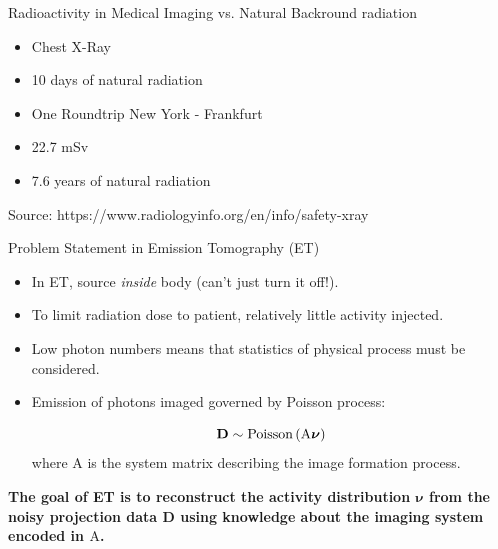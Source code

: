 \begin{frame}[c]{Radioactivity in Medical Imaging vs. Natural Backround radiation}

       \textbf{\large \color{faublue}{Effective radioactivity of 0.1mSv}}
       \begin{itemize}
            \setlength\itemsep{0.4cm}
            \item Chest X-Ray
            \item 10 days of natural radiation
            \item One Roundtrip New York - Frankfurt
        \end{itemize}
        
        \bigskip
	\textbf{\large \color{faublue}{Nuclear Medicine: Whole body PET}}
 	\begin{itemize}
	 	 \setlength\itemsep{0.4cm}
		\item22.7 mSv
	 	\item7.6 years of natural radiation
	 \end{itemize}
	
        \bigskip
	\scriptsize Source: https://www.radiologyinfo.org/en/info/safety-xray

\end{frame}

\begin{frame}[c]{Problem Statement in Emission Tomography (ET)}

    \begin{itemize}
        \setlength\itemsep{0.3cm}
        \item In ET, source \emph{inside} body (can't just turn it off!).
        \item To limit radiation dose to patient,  relatively little activity injected.
        \item Low photon numbers means that statistics of physical process must be considered.
        \item Emission of photons imaged governed by Poisson process:

              \begin{equation*}
                  \mathbf{D} \sim \text{Poisson}\left( \text{A\boldmath$\nu$} \right)
              \end{equation*}
              where $\text{A}$ is the system matrix describing the image formation process.
    \end{itemize}
    \vspace{0.5cm}


    \textbf{The goal of ET is to reconstruct the activity distribution {$\mathbf{\nu}$} from the noisy projection data $\mathbf{D}$ using knowledge about the imaging system encoded in $\text{A}$.}
\end{frame}


